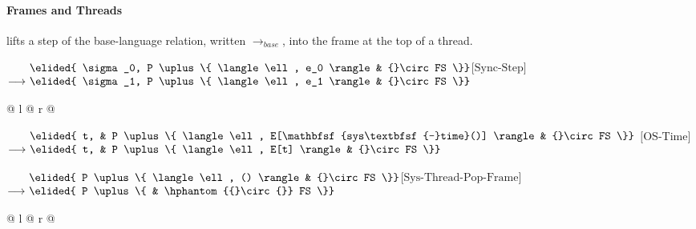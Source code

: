 \paragraph{Frames and Threads}
 lifts a step of the base-language relation, written $\longrightarrow_{\mathit{base}}$, into the frame at the top of a thread.

\noindent
$\begin{array}[t]{@{}r@{\ }l@{}l@{}}
                & \elided{ \sigma_0, P \uplus \{ \langle \ell, e_0 \rangle & {}\circ FS \}} \\
\longrightarrow & \elided{ \sigma_1, P \uplus \{ \langle \ell, e_1 \rangle & {}\circ FS \}}
\end{array}$\hfill$\text{[Sync-Step]}$\par
\noindent
\begin{tabular*}{\linewidth}{@{} l @{\extracolsep{\fill}} r @{}}
\end{tabular*}

\vspace{1em}
\noindent
$\begin{array}[t]{@{}r@{\ }l@{\ }l@{}l@{}}
                & \elided{ t, & P \uplus \{ \langle \ell, E[\mathbfsf{sys\textbfsf{-}time}()] \rangle & {}\circ FS \}} \\
\longrightarrow & \elided{ t, & P \uplus \{ \langle \ell, E[t] \rangle & {}\circ FS \}}
\end{array}$\hfill$\text{[OS-Time]}$\par

\vspace{1em}
\noindent
$\begin{array}[t]{@{}r@{\ }l@{}l@{}}
                & \elided{ P \uplus \{ \langle \ell, () \rangle & {}\circ FS \}} \\
\longrightarrow & \elided{ P \uplus \{ & \hphantom{{}\circ{}} FS \}}
\end{array}$\hfill$\text{[Sys-Thread-Pop-Frame]}$\par
\noindent
\begin{tabular*}{\linewidth}{@{} l @{\extracolsep{\fill}} r @{}}
\end{tabular*}

